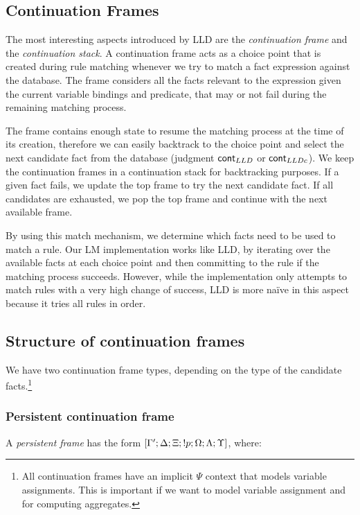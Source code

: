\subsection{Continuation Frames}

The most interesting aspects introduced by LLD are the \emph{continuation frame}
and the \emph{continuation stack}. A continuation frame acts as a choice point
that is created during rule matching whenever we try to match a fact expression
against the database.  The frame considers all the facts relevant to the
expression given the current variable bindings and predicate, that may or not
fail during the remaining matching process.

The frame contains enough state to resume the matching process at the time of
its creation, therefore we can easily backtrack to the choice point and select
the next candidate fact from the database (judgment $\mathsf{cont}_{LLD}$ or $\mathsf{cont}_{LLDc}$).
We keep the continuation frames in a continuation stack for backtracking
purposes. If a given fact fails, we update the top frame to try the next
candidate fact. If all candidates are exhausted, we pop the top frame and
continue with the next available frame.

By using this match mechanism, we determine which facts need to be used to match
a rule.  Our LM implementation works like LLD, by iterating over the available
facts at each choice point and then committing to the rule if the matching
process succeeds. However, while the implementation only attempts to match rules
with a very high change of success, LLD is more na\"{i}ve in this aspect because
it tries all rules in order.

\subsection{Structure of continuation frames}

We have two continuation frame types, depending on the type of the candidate
facts.\footnote{All continuation frames have an implicit $\Psi$ context that
models variable assignments. This is important if we want to model variable
assignment and for computing aggregates.}

\subsubsection{Persistent continuation frame}

A \emph{persistent frame} has the form $[\Gamma'; \Delta; \Xi; {!} p; \Omega;
\Lambda; \Upsilon]$, where:

